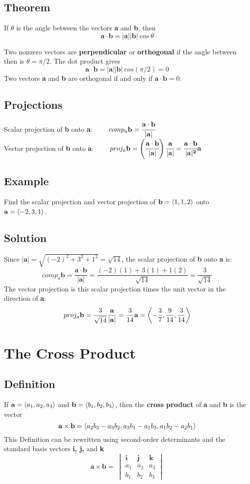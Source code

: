 \subsection*{Theorem}
If $\theta$ is the angle between the vectors \textbf{a} and \textbf{b}, then
$$\mathbf{a\cdot b} = \mathbf{|a||b|}\:cos\:\theta$$

Two nonzero vectors are \textbf{perpendicular} or \textbf{orthogonal} if the angle
between then is $\theta=\pi/2$. The dot product gives
$$\mathbf{a\cdot b}=\mathbf{|a||b|}\:cos(\pi/2)=0$$
Two vectors \textbf{a} and \textbf{b} are orthogonal if and only if $\mathbf{a\cdot b}=0$.

\subsection*{Projections}
Scalar projection of \textbf{b} onto \textbf{a}: $\qquad comp_a\textbf{b}=
    \mathbf{\cfrac{a\cdot b}{|a|}}$ \\
Vector projection of \textbf{b} onto \textbf{a}: $\qquad proj_a\textbf{b}=
    \mathbf{\left(\cfrac{a\cdot b}{|a|}\right)\cfrac{a}{|a|}}=\mathbf{\cfrac{a\cdot b}{|a|^2}a}$

\subsection*{Example}
Find the scalar projection and vector projection of $\textbf{b}=\ev{1,1,2}$ onto
$\textbf{a}=\ev{-2,3,1}$.

\subsection*{Solution}
Since $|\textbf{a}|=\sqrt{(-2)^2+3^2+1^2}=\sqrt{14}$, the scalar projection of \textbf{b}
onto \textbf{a} is:
$$comp_a\textbf{b}=\mathbf{\frac{a\cdot b}{|a|}}=\frac{(-2)(1)+3(1)+1(2)}{\sqrt{14}}=\frac{3}{\sqrt{14}}$$
The vector projection is this scalar projection times the unit vector in the direction of \textbf{a}:
$$proj_a\textbf{b}=\frac{3}{\sqrt{14}}\mathbf{\frac{a}{|a|}}=\frac{3}{14}\textbf{a}=
    \ev{-\frac{3}{7},\frac{9}{14},\frac{3}{14}}$$

\section{The Cross Product}

\subsection*{Definition}
If $\textbf{a}=\ev{a_1,a_2,a_3}$ and $\textbf{b}=\ev{b_1,b_2,b_3}$, then the
\textbf{cross product} of \textbf{a} and \textbf{b} is the vector
$$\mathbf{a \times b}=\ev{a_2b_3-a_3b_2,a_3b_1-a_1b_3,a_1b_2-a_2b_1}$$
This Definition can be rewritten using second-order determinants and the standard
basis vectors \textbf{i, j,} and \textbf{k}
$$\mathbf{a\times b}=\
    \begin{vmatrix}
        \textbf{i} & \textbf{j} & \textbf{k} \\
        a_1        & a_2        & a_3        \\
        b_1        & b_2        & b_3
    \end{vmatrix}$$


